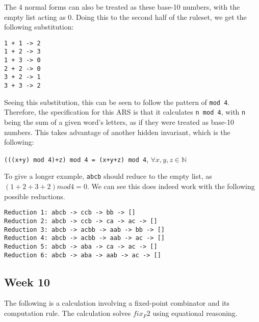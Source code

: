 \documentclass{article}
\theoremstyle{theorem}
\theoremstyle{definition}
\theoremstyle{remark}
\begin{document}
The 4 normal forms can also be treated as these base-10 numbers, with the empty list acting as $0$. Doing this to the second half of the ruleset, we get the following substitution:

\begin{lstlisting}
1 + 1 -> 2
1 + 2 -> 3
1 + 3 -> 0
2 + 2 -> 0
3 + 2 -> 1
3 + 3 -> 2
\end{lstlisting}

Seeing this substitution, this can be seen to follow the pattern of \texttt{mod 4}. Therefore, the specification for this ARS is that it calculates \texttt{n mod 4}, with \texttt{n} being the sum of a given word's letters, as if they were treated as base-10 numbers. This takes advantage of another hidden invariant, which is the following:

\texttt{(((x+y) mod 4)+z) mod 4 = (x+y+z) mod 4}, $\forall x, y, z \in\mathbb{N}$

To give a longer example, \texttt{abcb} should reduce to the empty list, as $(1+2+3+2)mod4 = 0$. We can see this does indeed work with the following possible reductions.

\begin{lstlisting}
Reduction 1: abcb -> ccb -> bb -> []
Reduction 2: abcb -> ccb -> ca -> ac -> []
Reduction 3: abcb -> acbb -> aab -> bb -> []
Reduction 4: abcb -> acbb -> aab -> ac -> []
Reduction 5: abcb -> aba -> ca -> ac -> []
Reduction 6: abcb -> aba -> aab -> ac -> []
\end{lstlisting}

\newpage

\subsection{Week 10}
The following is a calculation involving a fixed-point combinator and its computation rule. The calculation solves $fix_F 2$ using equational reasoning. 
\end{document}
